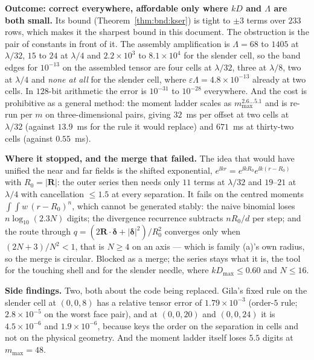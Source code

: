 \textbf{Outcome: correct everywhere, affordable only where $kD$ and $\Lambda$ are both
small.} Its bound (Theorem~\ref{thm:bnd:kser}) is tight to $\pm3$ terms over $233$ rows,
which makes it the sharpest bound in this document. The obstruction is the pair of
constants in front of it. The assembly amplification is $\Lambda = 68$ to $1405$ at
$\lambda/32$, $15$ to $24$ at $\lambda/4$ and $2.2\times10^{3}$ to $8.1\times10^{4}$ for
the slender cell, so the  band edges for $10^{-13}$ on the assembled tensor
are four cells at $\lambda/32$, three at $\lambda/8$, two at $\lambda/4$ and
\emph{none at all} for the slender cell, where $\varepsilon\Lambda = 4.8\times10^{-13}$
already at two cells. In $128$-bit arithmetic the error is $10^{-31}$ to $10^{-28}$
everywhere. And the cost is prohibitive as a general method: the moment ladder scales as
$m_{\max}^{2.6\dots5.1}$ and is re-run per $m$ on three-dimensional pairs, giving $32$~ms
per offset at two cells at $\lambda/32$ (against $13.9$~ms for the rule it would replace)
and $671$~ms at thirty-two cells (against $0.55$~ms).

\textbf{Where it stopped, and the merge that failed.} The idea that would have unified the
near and far fields is the shifted exponential, $e^{\ii kr} = e^{\ii kR_0}
e^{\ii k(r-R_0)}$ with $R_0 = |\mathbf{R}|$: the outer series then needs only $11$ terms
at $\lambda/32$ and $19$--$21$ at $\lambda/4$ with cancellation $\le 1.5$ at every
separation. It fails on the centred moments $\int\int w\,(r-R_0)^n$, which cannot be
generated stably: the naive binomial loses $n\log_{10}(2.3N)$ digits; the divergence
recurrence subtracts $nR_0/d$ per step; and the route through
$q = (2\mathbf{R}\cdot\boldsymbol{\delta}+|\boldsymbol{\delta}|^2)/R_0^2$ converges only
when $(2N+3)/N^2 < 1$, that is $N \ge 4$ on an axis --- which is family (a)'s own radius,
so the merge is circular. Blocked as a merge; the series stays what it is, the tool for
the touching shell and for the slender needle, where $kD_{\max} \le 0.60$ and
$N \le 16$.

\textbf{Side findings.} Two, both about the code being replaced. Gila's fixed rule on the
slender cell at $(0,0,8)$ has a relative tensor error of $1.79\times10^{-3}$ (order-$5$
rule; $2.8\times10^{-5}$ on the worst face pair), and at $(0,0,20)$ and $(0,0,24)$ it is
$4.5\times10^{-6}$ and $1.9\times10^{-6}$, because  keys the order on the
separation in cells and not on the physical geometry. And the  moment
ladder itself loses $5.5$ digits at $m_{\max} = 48$.

